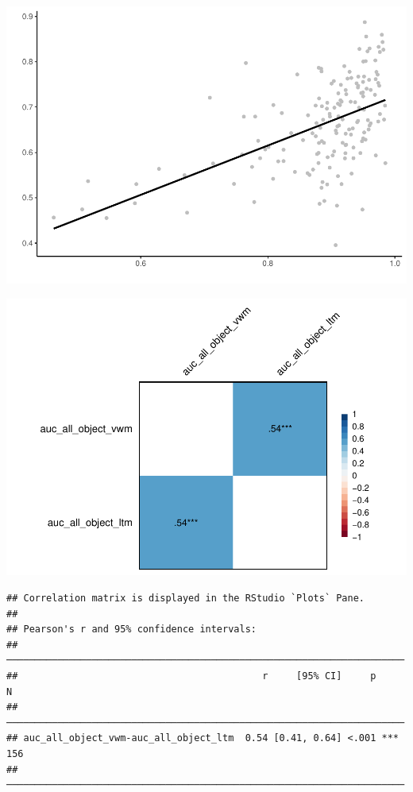 \documentclass[
  man]{apa6}
\begin{document}
\includegraphics{Script_Re_Greer_2023_group1Rock_2023_files/figure-latex/unnamed-chunk-11-1.pdf}

\includegraphics{Script_Re_Greer_2023_group1Rock_2023_files/figure-latex/unnamed-chunk-12-1.pdf}

\begin{verbatim}
## Correlation matrix is displayed in the RStudio `Plots` Pane.
## 
## Pearson's r and 95% confidence intervals:
## ──────────────────────────────────────────────────────────────────────
##                                           r     [95% CI]     p       N
## ──────────────────────────────────────────────────────────────────────
## auc_all_object_vwm-auc_all_object_ltm  0.54 [0.41, 0.64] <.001 *** 156
## ──────────────────────────────────────────────────────────────────────
\end{verbatim}
\end{document}
